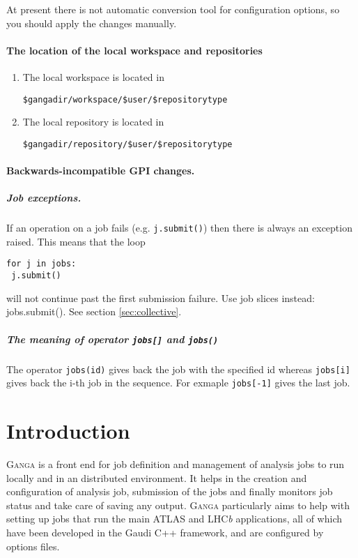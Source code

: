 \documentclass{howto}
\def\ganga {\textsc{Ganga}\xspace}
\def\lhcb {LHC{\em b\/}\xspace}
\begin{document}
At present there is not automatic conversion tool for configuration options, so you should apply the changes manually.

\paragraph{The location of the local workspace and repositories}
\begin{enumerate}
\item The local workspace is located in \begin{verbatim}$gangadir/workspace/$user/$repositorytype\end{verbatim}
\item The local repository is located in \begin{verbatim}$gangadir/repository/$user/$repositorytype\end{verbatim}
\end{enumerate}


\paragraph{Backwards-incompatible GPI changes.}

\subparagraph{Job exceptions.}

If an operation on a job fails (e.g. \texttt{j.submit()}) then there is always an exception raised. This means that the loop 
\begin{verbatim}
for j in jobs:
 j.submit()
\end{verbatim}
will not continue past the first submission failure. Use job slices instead: jobs.submit(). See section \ref{sec:collective}.

\subparagraph{The meaning of operator \texttt{jobs[]} and \texttt{jobs()}}

The operator \texttt{jobs(id)} gives back the job with the specified
id whereas \texttt{jobs[i]} gives back the i-th job in the
sequence. For exmaple \texttt{jobs[-1]} gives the last job.


\section{Introduction}
\label{Introduction}
\noindent

\ganga is a front end for job definition and management of analysis jobs to
run locally and in an distributed environment. It helps in the creation and
configuration of analysis job, submission of the jobs and finally monitors job
status and take care of saving any output. \ganga particularly aims to help
with setting up jobs that run the main ATLAS and \lhcb applications, all of
which have been developed in the Gaudi C++ framework, and are configured by
options files.
\end{document}
